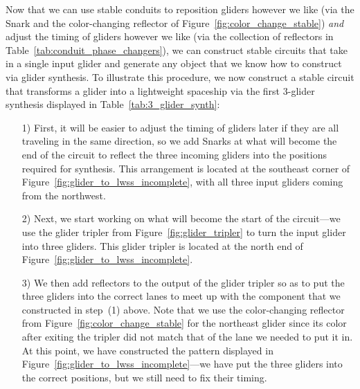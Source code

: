 Now that we can use stable conduits to reposition gliders however we like (via the Snark and the color-changing reflector of Figure~\ref{fig:color_change_stable}) \emph{and} adjust the timing of gliders however we like (via the collection of reflectors in Table~\ref{tab:conduit_phase_changers}), we can construct stable circuits that take in a single input glider and generate any object that we know how to construct via glider synthesis. To illustrate this procedure, we now construct a stable circuit that transforms a glider into a lightweight spaceship via the first $3$-glider synthesis displayed in Table~\ref{tab:3_glider_synth}:\medskip

\begin{itemize}
	\item[1)] First, it will be easier to adjust the timing of gliders later if they are all traveling in the same direction, so we add Snarks at what will become the end of the circuit to reflect the three incoming gliders into the positions required for synthesis. This arrangement is located at the southeast corner of Figure~\ref{fig:glider_to_lwss_incomplete}, with all three input gliders coming from the northwest.\smallskip
	
	\item[2)] Next, we start working on what will become the start of the circuit---we use the glider tripler from Figure~\ref{fig:glider_tripler} to turn the input glider into three gliders. This glider tripler is located at the north end of Figure~\ref{fig:glider_to_lwss_incomplete}.\smallskip
	
	\item[3)] We then add reflectors to the output of the glider tripler so as to put the three gliders into the correct lanes to meet up with the component that we constructed in step~(1) above. Note that we use the color-changing reflector from Figure~\ref{fig:color_change_stable} for the northeast glider since its color after exiting the tripler did not match that of the lane we needed to put it in. At this point, we have constructed the pattern displayed in Figure~\ref{fig:glider_to_lwss_incomplete}---we have put the three gliders into the correct positions, but we still need to fix their timing.\smallskip
	

\end{itemize}
